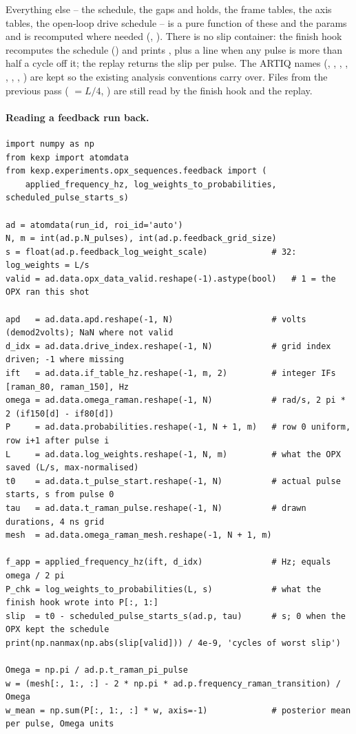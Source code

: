 Everything else -- the schedule, the gaps and holds, the frame tables, the
axis tables, the open-loop drive schedule -- is a pure function of these and
the params and is recomputed where needed (,
). There is no slip container: the finish hook
recomputes the schedule () and prints
, plus a
\code{***} line when any pulse is more than half a cycle off it; the replay
returns the slip per pulse. The ARTIQ names (, ,
, , , ,
, ) are kept so the existing
analysis conventions carry over. Files from the previous pass
( $= L/4$, ) are still read by the finish
hook and the replay.

\paragraph{Reading a feedback run back.}

\begin{lstlisting}[style=py]
import numpy as np
from kexp import atomdata
from kexp.experiments.opx_sequences.feedback import (
    applied_frequency_hz, log_weights_to_probabilities, scheduled_pulse_starts_s)

ad = atomdata(run_id, roi_id='auto')
N, m = int(ad.p.N_pulses), int(ad.p.feedback_grid_size)
s = float(ad.p.feedback_log_weight_scale)             # 32: log_weights = L/s
valid = ad.data.opx_data_valid.reshape(-1).astype(bool)   # 1 = the OPX ran this shot

apd   = ad.data.apd.reshape(-1, N)                    # volts (demod2volts); NaN where not valid
d_idx = ad.data.drive_index.reshape(-1, N)            # grid index driven; -1 where missing
ift   = ad.data.if_table_hz.reshape(-1, m, 2)         # integer IFs [raman_80, raman_150], Hz
omega = ad.data.omega_raman.reshape(-1, N)            # rad/s, 2 pi * 2 (if150[d] - if80[d])
P     = ad.data.probabilities.reshape(-1, N + 1, m)   # row 0 uniform, row i+1 after pulse i
L     = ad.data.log_weights.reshape(-1, N, m)         # what the OPX saved (L/s, max-normalised)
t0    = ad.data.t_pulse_start.reshape(-1, N)          # actual pulse starts, s from pulse 0
tau   = ad.data.t_raman_pulse.reshape(-1, N)          # drawn durations, 4 ns grid
mesh  = ad.data.omega_raman_mesh.reshape(-1, N + 1, m)

f_app = applied_frequency_hz(ift, d_idx)              # Hz; equals omega / 2 pi
P_chk = log_weights_to_probabilities(L, s)            # what the finish hook wrote into P[:, 1:]
slip  = t0 - scheduled_pulse_starts_s(ad.p, tau)      # s; 0 when the OPX kept the schedule
print(np.nanmax(np.abs(slip[valid])) / 4e-9, 'cycles of worst slip')

Omega = np.pi / ad.p.t_raman_pi_pulse
w = (mesh[:, 1:, :] - 2 * np.pi * ad.p.frequency_raman_transition) / Omega
w_mean = np.sum(P[:, 1:, :] * w, axis=-1)             # posterior mean per pulse, Omega units
\end{lstlisting}

